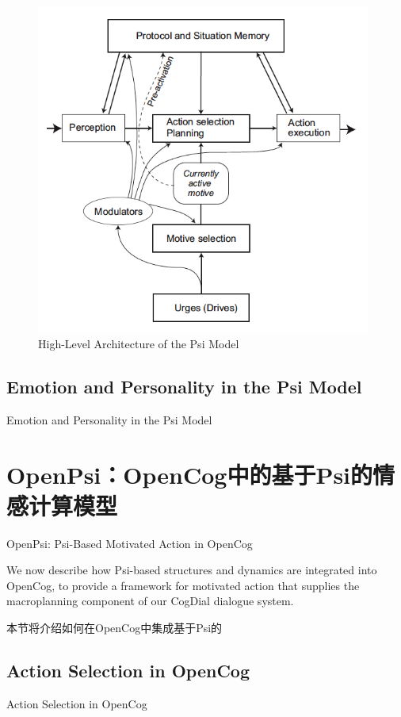 \begin{figure}[htb]
\centering
\includegraphics[width=11cm]{figures/Psi.png}
\caption{High-Level Architecture of the Psi Model}
\label{fig:Psi}
\end{figure}

\subsection{Emotion and Personality in the Psi Model}{Emotion and Personality in the Psi Model}

\section{OpenPsi：OpenCog中的基于Psi的情感计算模型}{OpenPsi: Psi-Based Motivated Action in OpenCog}

We now describe how Psi-based structures and dynamics are integrated into OpenCog, to provide a framework for motivated action that supplies the macroplanning component of our CogDial dialogue system.

本节将介绍如何在OpenCog中集成基于Psi的

\subsection{Action Selection in OpenCog}{Action Selection in OpenCog}

